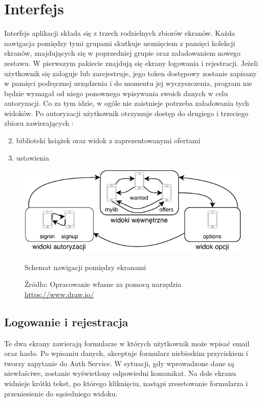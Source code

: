 \chapter{Interfejs}
\label{cha:interfejs}

Interfejs aplikacji składa się z trzech rodzielnych zbiorów ekranów. Każda nawigacja pomiędzy tymi grupami skutkuje usunięciem z pamięci kolekcji ekranów, znajdujących się w poprzedniej grupie oraz załadowaniem nowego zestawu.
W pierwszym pakiecie znajdują się ekrany logowania i rejestracji. Jeżeli użytkownik się zaloguje lub zarejestruje, jego token dostępowy zostanie zapisany w pamięci podręcznej urządzenia i do momentu jej wyczyszczenia, program nie będzie wymagał od niego ponownego wpisywania swoich danych w celu autoryzacji. Co za tym idzie, w ogóle nie zaistnieje potrzeba załadowania tych widoków.
Po autoryzacji użytkownik otrzymuje dostęp do drugiego i trzeciego zbioru zawierających :
\begin{enumerate}
    \setcounter{enumi}{1}
    \item biblioteki książek oraz widok z zaprezentowanymi ofertami
    \item ustawienia
\end{enumerate} 

\begin{figure}[H]
	\centering
	\includegraphics[width=\linewidth]{navig.pdf}
	\caption{Schemat nawigacji pomiędzy ekranami}
	\caption*{Źródło: {Opracowanie własne za pomocą narzędzia \url{https://www.draw.io/}}}
\end{figure}

\section{Logowanie i rejestracja}
Te dwa ekrany zawierają formularze w których użytkownik może wpisać email oraz hasło. Po wpisaniu danych, akceptuje formularz niebieskim przyciskiem i tworzy zapytanie do Auth Service. W sytuacji, gdy wprowadzone dane są niewłaściwe, zostanie wyświetlony odpowiedni komunikat.
Na dole ekranu widnieje krótki tekst, po którego kliknięciu, nastąpi zresetowanie formularza i przeniesienie do sąsiedniego widoku.

